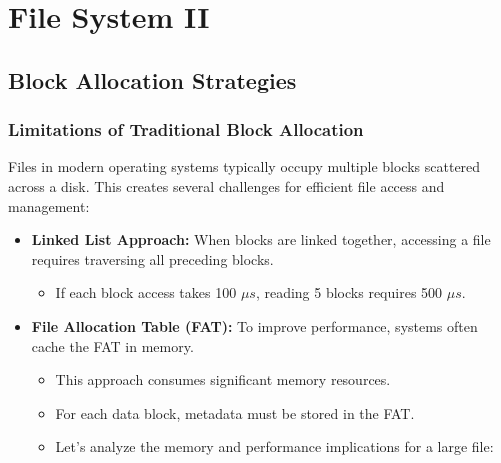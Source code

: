 \documentclass[../../compsys.tex]{subfiles}
\begin{document}
\chapter{File System II}
\vfill
\section{Block Allocation Strategies}
\subsection{Limitations of Traditional Block Allocation}

Files in modern operating systems typically occupy multiple blocks scattered across a disk. This creates several challenges for efficient file access and management:

\begin{itemize}
  \item \textbf{Linked List Approach:} When blocks are linked together, accessing a file requires traversing all preceding blocks.
    \begin{itemize}
      \item If each block access takes 100 $\mu s$, reading 5 blocks requires 500 $\mu s$.
    \end{itemize}
  
  \item \textbf{File Allocation Table (FAT):} To improve performance, systems often cache the FAT in memory.
    \begin{itemize}
      \item This approach consumes significant memory resources.
      \item For each data block, metadata must be stored in the FAT.
      \item Let's analyze the memory and performance implications for a large file:
    \end{itemize}
\end{itemize}
\end{document}

